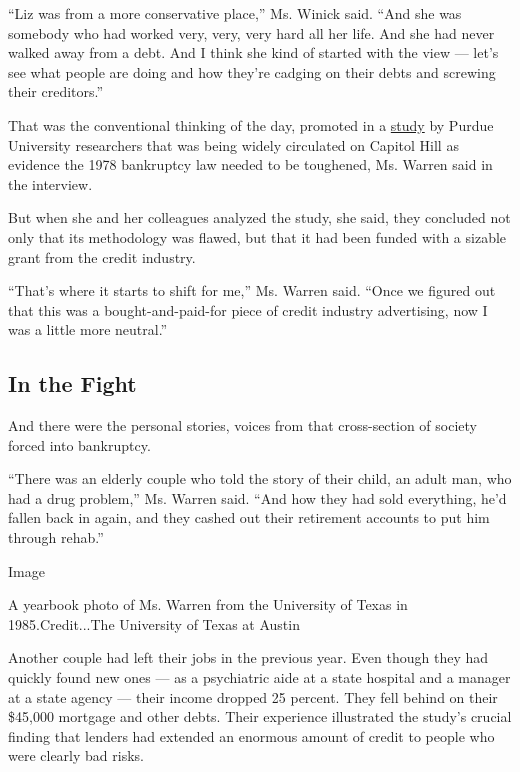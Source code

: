 ``Liz was from a more conservative place,'' Ms. Winick said. ``And she
was somebody who had worked very, very, very hard all her life. And she
had never walked away from a debt. And I think she kind of started with
the view --- let's see what people are doing and how they're cadging on
their debts and screwing their creditors.''

That was the conventional thinking of the day, promoted in a
\href{https://www.nytimes.com/1993/12/15/business/at-purdue-a-wealth-of-data-on-consumer-debt.html}{study}
by Purdue University researchers that was being widely circulated on
Capitol Hill as evidence the 1978 bankruptcy law needed to be toughened,
Ms. Warren said in the interview.

But when she and her colleagues analyzed the study, she said, they
concluded not only that its methodology was flawed, but that it had been
funded with a sizable grant from the credit industry.

``That's where it starts to shift for me,'' Ms. Warren said. ``Once we
figured out that this was a bought-and-paid-for piece of credit industry
advertising, now I was a little more neutral.''

\hypertarget{in-the-fight}{%
\subsection{In the Fight}\label{in-the-fight}}

And there were the personal stories, voices from that cross-section of
society forced into bankruptcy.

``There was an elderly couple who told the story of their child, an
adult man, who had a drug problem,'' Ms. Warren said. ``And how they had
sold everything, he'd fallen back in again, and they cashed out their
retirement accounts to put him through rehab.''

Image

A yearbook photo of Ms. Warren from the University of Texas in
1985.Credit...The University of Texas at Austin

Another couple had left their jobs in the previous year. Even though
they had quickly found new ones --- as a psychiatric aide at a state
hospital and a manager at a state agency --- their income dropped 25
percent. They fell behind on their \$45,000 mortgage and other debts.
Their experience illustrated the study's crucial finding that lenders
had extended an enormous amount of credit to people who were clearly bad
risks.

